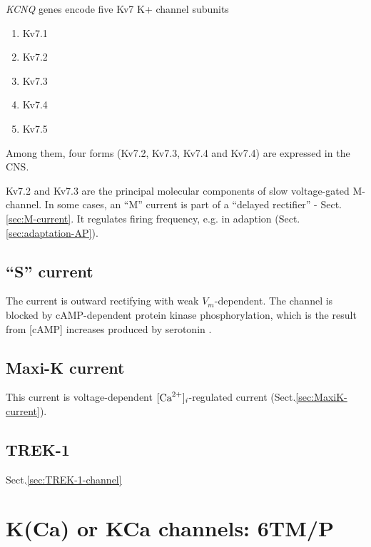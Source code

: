 {\it KCNQ} genes encode five Kv7 K+ channel subunits
\begin{enumerate}
  \item Kv7.1
  
  \item Kv7.2
  
  \item Kv7.3
  
  \item Kv7.4
  
  \item Kv7.5
\end{enumerate}
Among them, four forms (Kv7.2, Kv7.3, Kv7.4 and Kv7.4) are expressed in the
CNS.

Kv7.2 and Kv7.3 are the principal molecular components of slow voltage-gated
M-channel. In some cases, an ``M'' current is part of a ``delayed rectifier''
- Sect.\ref{sec:M-current}. It regulates firing frequency, e.g. in adaption
(Sect.\ref{sec:adaptation-AP}).



\subsection{``S'' current}

The current is outward rectifying with weak $V_m$-dependent. The channel is
blocked by cAMP-dependent protein kinase phosphorylation, which is the result
from [cAMP] increases produced by serotonin \citep{klein1982}.



\subsection{Maxi-K current}

This current is voltage-dependent $[{\text{Ca}^{2+}}]_i$-regulated current
(Sect.\ref{sec:MaxiK-current}).

\subsection{TREK-1}

Sect.\ref{sec:TREK-1-channel}

\section{K(Ca) or KCa channels: 6TM/P}
\label{sec:Kchannel_Ca-activated}
\label{sec:K(Ca)_family}

